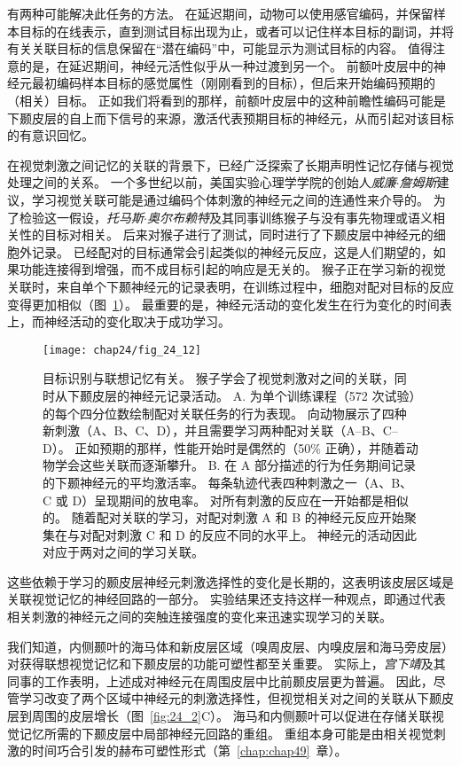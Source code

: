 有两种可能解决此任务的方法。
在延迟期间，动物可以使用感官编码，并保留样本目标的在线表示，直到测试目标出现为止，或者可以记住样本目标的副词，并将有关关联目标的信息保留在“潜在编码”中，可能显示为测试目标的内容。
值得注意的是，在延迟期间，神经元活性似乎从一种过渡到另一个。
前额叶皮层中的神经元最初编码样本目标的感觉属性（刚刚看到的目标），但后来开始编码预期的（相关）目标。
正如我们将看到的那样，前额叶皮层中的这种前瞻性编码可能是下颞皮层的自上而下信号的来源，激活代表预期目标的神经元，从而引起对该目标的有意识回忆。


在视觉刺激之间记忆的关联的背景下，已经广泛探索了长期声明性记忆存储与视觉处理之间的关系。
一个多世纪以前，美国实验心理学学院的创始人\textit{威廉$\cdot$詹姆斯}建议，学习视觉关联可能是通过编码个体刺激的神经元之间的连通性来介导的。
为了检验这一假设，\textit{托马斯$\cdot$奥尔布赖特}及其同事训练猴子与没有事先物理或语义相关性的目标对相关。
后来对猴子进行了测试，同时进行了下颞皮层中神经元的细胞外记录。
已经配对的目标通常会引起类似的神经元反应，这是人们期望的，如果功能连接得到增强，而不成目标引起的响应是无关的。
猴子正在学习新的视觉关联时，来自单个下颞神经元的记录表明，在训练过程中，细胞对配对目标的反应变得更加相似（图~\ref{fig:24_12}）。
最重要的是，神经元活动的变化发生在行为变化的时间表上，而神经活动的变化取决于成功学习。


\begin{figure}[htbp]
	\centering
	\texttt{[image: chap24/fig\_24\_12]}
	\caption{目标识别与联想记忆有关。
		猴子学会了视觉刺激对之间的关联，同时从下颞皮层的神经元记录活动。
		A. 为单个训练课程（572 次试验）的每个四分位数绘制配对关联任务的行为表现。
		向动物展示了四种新刺激（A、B、C、D），并且需要学习两种配对关联（A–B、C–D）。
		正如预期的那样，性能开始时是偶然的（50\% 正确），并随着动物学会这些关联而逐渐攀升。
		B. 在 A 部分描述的行为任务期间记录的下颞神经元的平均激活率。
		每条轨迹代表四种刺激之一（A、B、C 或 D）呈现期间的放电率。
		对所有刺激的反应在一开始都是相似的。
		随着配对关联的学习，对配对刺激 A 和 B 的神经元反应开始聚集在与对配对刺激 C 和 D 的反应不同的水平上。
		神经元的活动因此对应于两对之间的学习关联。}
	\label{fig:24_12}
\end{figure}


这些依赖于学习的颞皮层神经元刺激选择性的变化是长期的，这表明该皮层区域是关联视觉记忆的神经回路的一部分。
实验结果还支持这样一种观点，即通过代表相关刺激的神经元之间的突触连接强度的变化来迅速实现学习的关联。


我们知道，内侧颞叶的海马体和新皮层区域（嗅周皮层、内嗅皮层和海马旁皮层）对获得联想视觉记忆和下颞皮层的功能可塑性都至关重要。
实际上，\textit{宫下靖}及其同事的工作表明，上述成对神经元在周围皮层中比前颞皮层更为普遍。
因此，尽管学习改变了两个区域中神经元的刺激选择性，但视觉相关对之间的关联从下颞皮层到周围的皮层增长（图~\ref{fig:24_2}C）。
海马和内侧颞叶可以促进在存储关联视觉记忆所需的下颞皮层中局部神经元回路的重组。
重组本身可能是由相关视觉刺激的时间巧合引发的赫布可塑性形式（第~\ref{chap:chap49}~章）。



